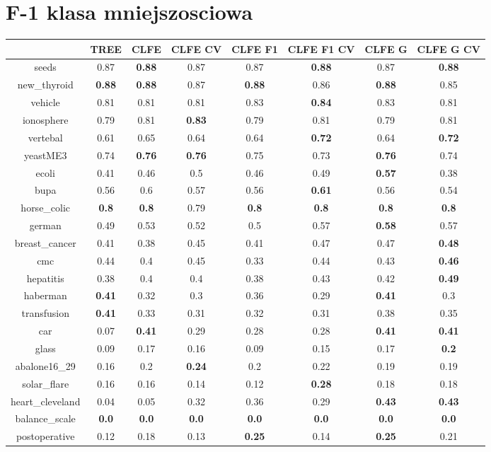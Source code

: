 \documentclass{article}%
\begin{document}
%
\section*{F{-}1 klasa mniejszosciowa}%
\begin{tabular}{c|ccccccc}%
\hline%
&TREE&CLFE&CLFE CV&CLFE F1&CLFE F1 CV&CLFE G&CLFE G CV\\%
\hline%
seeds&0.87&\textbf{0.88}&0.87&0.87&\textbf{0.88}&0.87&\textbf{0.88}\\%
new\_thyroid&\textbf{0.88}&\textbf{0.88}&0.87&\textbf{0.88}&0.86&\textbf{0.88}&0.85\\%
vehicle&0.81&0.81&0.81&0.83&\textbf{0.84}&0.83&0.81\\%
ionosphere&0.79&0.81&\textbf{0.83}&0.79&0.81&0.79&0.81\\%
vertebal&0.61&0.65&0.64&0.64&\textbf{0.72}&0.64&\textbf{0.72}\\%
yeastME3&0.74&\textbf{0.76}&\textbf{0.76}&0.75&0.73&\textbf{0.76}&0.74\\%
ecoli&0.41&0.46&0.5&0.46&0.49&\textbf{0.57}&0.38\\%
bupa&0.56&0.6&0.57&0.56&\textbf{0.61}&0.56&0.54\\%
horse\_colic&\textbf{0.8}&\textbf{0.8}&0.79&\textbf{0.8}&\textbf{0.8}&\textbf{0.8}&\textbf{0.8}\\%
german&0.49&0.53&0.52&0.5&0.57&\textbf{0.58}&0.57\\%
breast\_cancer&0.41&0.38&0.45&0.41&0.47&0.47&\textbf{0.48}\\%
cmc&0.44&0.4&0.45&0.33&0.44&0.43&\textbf{0.46}\\%
hepatitis&0.38&0.4&0.4&0.38&0.43&0.42&\textbf{0.49}\\%
haberman&\textbf{0.41}&0.32&0.3&0.36&0.29&\textbf{0.41}&0.3\\%
transfusion&\textbf{0.41}&0.33&0.31&0.32&0.31&0.38&0.35\\%
car&0.07&\textbf{0.41}&0.29&0.28&0.28&\textbf{0.41}&\textbf{0.41}\\%
glass&0.09&0.17&0.16&0.09&0.15&0.17&\textbf{0.2}\\%
abalone16\_29&0.16&0.2&\textbf{0.24}&0.2&0.22&0.19&0.19\\%
solar\_flare&0.16&0.16&0.14&0.12&\textbf{0.28}&0.18&0.18\\%
heart\_cleveland&0.04&0.05&0.32&0.36&0.29&\textbf{0.43}&\textbf{0.43}\\%
balance\_scale&\textbf{0.0}&\textbf{0.0}&\textbf{0.0}&\textbf{0.0}&\textbf{0.0}&\textbf{0.0}&\textbf{0.0}\\%
postoperative&0.12&0.18&0.13&\textbf{0.25}&0.14&\textbf{0.25}&0.21\\%
\end{tabular}
\end{document}
